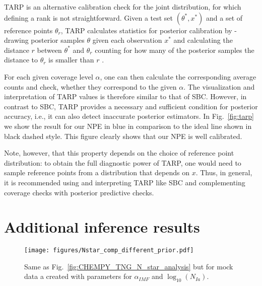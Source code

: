 \documentclass{aa}
\begin{document}
\begin{appendix}
TARP \citep{Lemos2023} is an alternative calibration check for the joint distribution, for which defining a rank is not straightforward. Given a test set $(\theta^*,x^*)$ and a set of reference points $\theta_r$, TARP calculates statistics for posterior calibration by - drawing posterior samples $\theta$ given each observation $x^*$ and calculating the distance $r$ between $\theta^*$ and $\theta_r$ counting for how many of the posterior samples the distance to $\theta_r$ is smaller than $r$ \citep[see e.g. Fig.~2 in][for an illustration]{Lemos2023}.

For each given coverage level $\alpha$, one can then calculate the corresponding average counts and check, whether they correspond to the given $\alpha$. The visualization and interpretation of TARP values is therefore similar to that of SBC. However, in contrast to SBC, TARP provides a necessary and sufficient condition for posterior accuracy, i.e., it can also detect inaccurate posterior estimators. In Fig.~\ref{fig:tarp} we show the result for our NPE in blue in comparison to the ideal line shown in black dashed style. This figure clearly shows that our NPE is well calibrated.

Note, however, that this property depends on the choice of reference point distribution: to obtain the full diagnostic power of TARP, one would need to sample reference points from a distribution that depends on $x$. Thus, in general, it is recommended using and interpreting TARP like SBC and complementing coverage checks with posterior predictive checks.

\section{Additional inference results}

\begin{figure*}
    \centering
    \texttt{[image: figures/Nstar\_comp\_different\_prior.pdf]}
    \vspace{-.5cm}
    \caption{Same as Fig.~\ref{fig:CHEMPY_TNG_N_star_analysis} but for mock data a created with parameters for $\alpha_{IMF}$ and $\log_{10}(N_{Ia})$.}
    \label{fig:N_star_analysis_different_prior}
\end{figure*}
\end{appendix}
\end{document}
